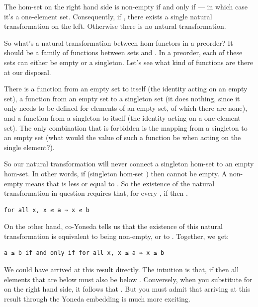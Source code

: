 The hom-set on the right hand side is non-empty if and only if
 --- in which case it's a one-element set.
Consequently, if , there exists a single
natural transformation on the left. Otherwise there is no natural
transformation.

So what's a natural transformation between hom-functors in a preorder?
It should be a family of functions between sets  and
. In a preorder, each of these sets can either be empty
or a singleton. Let's see what kind of functions are there at our
disposal.

There is a function from an empty set to itself (the identity acting on
an empty set), a function  from an empty set to a
singleton set (it does nothing, since it only needs to be defined for
elements of an empty set, of which there are none), and a function from
a singleton to itself (the identity acting on a one-element set). The
only combination that is forbidden is the mapping from a singleton to an
empty set (what would the value of such a function be when acting on the
single element?).

So our natural transformation will never connect a singleton hom-set to
an empty hom-set. In other words, if 
(singleton hom-set ) then  cannot be
empty. A non-empty  means that  is less or
equal to . So the existence of the natural transformation in
question requires that, for every , if
 then .

\begin{Verbatim}[commandchars=\\\{\}]
for all x, x ≤ a ⇒ x ≤ b
\end{Verbatim}

On the other hand, co-Yoneda tells us that the existence of this natural
transformation is equivalent to  being non-empty, or to
. Together, we get:

\begin{Verbatim}[commandchars=\\\{\}]
a ≤ b if and only if for all x, x ≤ a ⇒ x ≤ b
\end{Verbatim}

We could have arrived at this result directly. The intuition is that, if
 then all elements that are below 
must also be below . Conversely, when you substitute
 for  on the right hand side, it follows that
. But you must admit that arriving at this
result through the Yoneda embedding is much more exciting.

